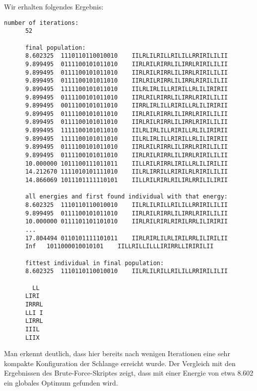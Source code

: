 \documentclass[parskip=half,paper=a4]{scrartcl}
\begin{document}
    Wir erhalten folgendes Ergebnis:
    \begin{lstlisting}[gobble=6,basicstyle=\small\ttfamily]
      number of iterations:
      52
      
      final population:
      8.602325	1110110110010010	IILRLILRILLRILILLRRIRILILII
      9.899495	0111100101011010	IIRLRILRIRRLILIRRLRIRILILII
      9.899495	0111100101011010	IIRLRILRIRRLILIRRLRIRILILII
      9.899495	0111100101011010	IIRLRILRIRRLILIRRLRIRILILII
      9.899495	1111100101011010	IILRLIRLILLRIRILLRLILIRIRII
      9.899495	0111100101011010	IIRLRILRIRRLILIRRLRIRILILII
      9.899495	0011100101011010	IIRRLIRLILLRIRILLRLILIRIRII
      9.899495	0111100101011010	IIRLRILRIRRLILIRRLRIRILILII
      9.899495	0111100101011010	IIRLRILRIRRLILIRRLRIRILILII
      9.899495	1111100101011010	IILRLIRLILLRIRILLRLILIRIRII
      9.899495	1111100101011010	IILRLIRLILLRIRILLRLILIRIRII
      9.899495	0111100101011010	IIRLRILRIRRLILIRRLRIRILILII
      9.899495	0111100101011010	IIRLRILRIRRLILIRRLRIRILILII
      10.000000	1011100111011011	IILLRILRIRRLIRILLRLILIRILII
      14.212670	1111010101111010	IILRLIRRILLRIRILRLRIRILILII
      14.866069	1011101111110101	IILLRILRIRLRILIRLRRILILIRII
      
      all energies and first found individual with that energy:
      8.602325	1110110110010010	IILRLILRILLRILILLRRIRILILII
      9.899495	0111100101011010	IIRLRILRIRRLILIRRLRIRILILII
      10.000000	0111101101101010	IIRLRILRIRLRIRILRRLILIRIRII
      ...
      17.804494	0110101111101011	IIRLRIRLILRLIRILRRLILIRILII
      Inf	1011000010010101	IILLRILLILLLIRIRRLLIRIRILII
      
      fittest individual in final population:
      8.602325	1110110110010010	IILRLILRILLRILILLRRIRILILII
      
        LL 
      LIRI 
      IRRRL
      LLI I
      LIRRL
      IIIL 
      LIIX 
    \end{lstlisting}
    
    Man erkennt deutlich, dass hier bereits nach wenigen Iterationen
    eine sehr kompakte Konfiguration der Schlange erreicht wurde.
    Der Vergleich mit den Ergebnissen des Brute-Force-Skriptes zeigt,
    dass mit einer Energie von etwa 8.602 ein globales Optimum gefunden
    wird. 
  
\end{document}
